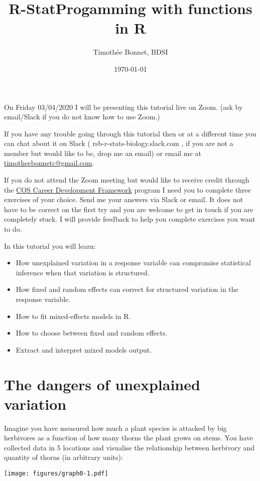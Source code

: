 \documentclass[12pt,a4paper]{scrartcl}\usepackage[]{graphicx}\usepackage[]{color}
\title{R-StatProgamming with functions in R}
\date{\today}
\author{Timoth\'ee Bonnet, BDSI}
\begin{document}
\maketitle

On Friday 03/04/2020 I will be presenting this tutorial live on Zoom. (ask by email/Slack if you do not know how to use Zoom.)

If you have any trouble going through this tutorial then or at a different time you can chat about it on Slack ( rsb-r-stats-biology.slack.com , if you are not a member but would like to be, drop me an email) or email me at \href{mailto:timotheebonnetc@gmail.com}{timotheebonnetc@gmail.com}.

If you do not attend the Zoom meeting but would like to receive credit through the \href{https://wattlecourses.anu.edu.au/enrol/index.php?id=23938}{COS Career Development Framework} program I need you to complete three exercises of your choice. Send me your answers via Slack or email. It does not have to be correct on the first try and you are welcome to get in touch if you are completely stuck. I will provide feedback to help you complete exercises you want to do.

In this tutorial you will learn:

\begin{itemize}
    \item How unexplained variation in a response variable can compromise statistical inference when that variation is structured.
    \item How fixed and random effects can correct for structured variation in the response variable.
    \item How to fit mixed-effects models in R.
    \item How to choose between fixed and random effects.
    \item Extract and interpret mixed models output.
\end{itemize}

\tableofcontents
\ListOfExerciseInToc
{}

\clearpage

\section{The dangers of unexplained variation}
Imagine you have measured how much a plant species is attacked by big herbivores as a function of how many thorns the plant grows on stems. You have collected data in 5 locations and visualise the relationship between herbivory and quantity of thorns (in arbitrary units):
\begin{center}
  \texttt{[image: figures/graph0-1.pdf]}
\end{center}
\end{document}
